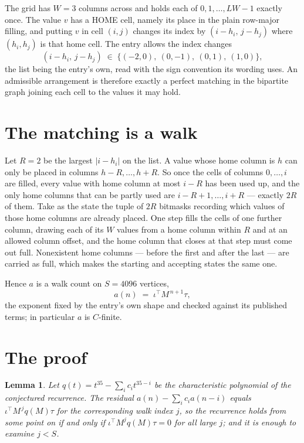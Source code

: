 \documentclass[11pt,a4paper]{article}
\theoremstyle{plain}
\newtheorem{lemma}[theorem]{Lemma}
\theoremstyle{definition}
\begin{document}
The grid has $W=3$ columns across and holds each of $0,1,\dots,LW-1$ exactly once. The value
$v$ has a HOME cell, namely its place in the plain row-major filling, and putting $v$ in cell
$(i,j)$ changes its index by $(i-h_i,\,j-h_j)$ where $(h_i,h_j)$ is that home cell. The entry
allows the index changes
\[
(i-h_i,\,j-h_j)\;\in\;\{(-2,0),\ (0,-1),\ (0,1),\ (1,0)\},
\]
the list being the entry's own, read with the sign convention its wording uses. An admissible
arrangement is therefore exactly a perfect matching in the bipartite graph joining each cell to
the values it may hold.

\section{The matching is a walk}

Let $R=2$ be the largest $|i-h_i|$ on the list. A value whose home column is $h$ can only be
placed in columns $h-R,\dots,h+R$. So once the cells of columns $0,\dots,i$ are filled, every
value with home column at most $i-R$ has been used up, and the only home columns that can be
partly used are $i-R+1,\dots,i+R$ --- exactly $2R$ of them. Take as the state the tuple of
$2R$ bitmasks recording which values of those home columns are already placed. One step fills
the cells of one further column, drawing each of its $W$ values from a home column within $R$
and at an allowed column offset, and the home column that closes at that step must come out
full. Nonexistent home columns --- before the first and after the last --- are carried as
full, which makes the starting and accepting states the same one.

Hence $a$ is a walk count on $S=4096$ vertices,
\[
a(n)\;=\;\iota^{\!\top}M^{\,n+1}\tau ,
\]
the exponent fixed by the entry's own shape and checked against its published terms; in
particular $a$ is $C$-finite.

\section{The proof}

\begin{lemma}\label{lem:crit}
Let $q(t)=t^{35}-\sum_i c_it^{35-i}$ be the characteristic polynomial of the
conjectured recurrence. The residual $a(n)-\sum_ic_ia(n-i)$ equals
$\iota^{\!\top}M^{\,j}q(M)\tau$ for the corresponding walk index $j$, so the recurrence
holds from some point on if and only if $\iota^{\!\top}M^{j}q(M)\tau=0$ for all large $j$;
and it is enough to examine $j<S$.
\end{lemma}
\end{document}
